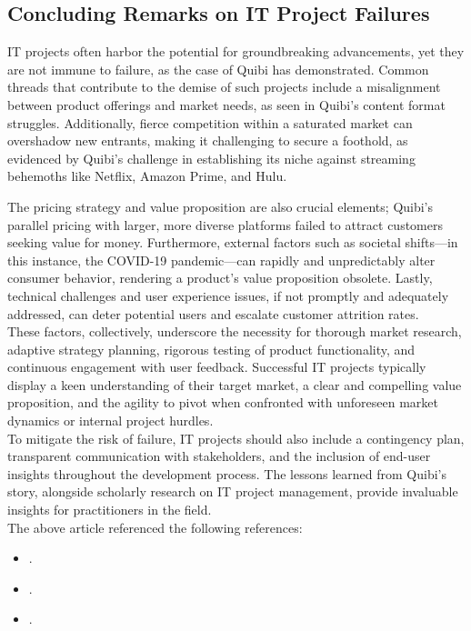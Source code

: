 \documentclass[12pt,a4paper]{article}
\begin{document}
\subsection{Concluding Remarks on IT Project Failures}
\label{sec:Question 3}
\nocite{question_3.3}

\noindent IT projects often harbor the potential for groundbreaking advancements, yet they are not immune to failure, as the case of Quibi has demonstrated. Common threads that contribute to the demise of such projects include a misalignment between product offerings and market needs, as seen in Quibi's content format struggles. Additionally, fierce competition within a saturated market can overshadow new entrants, making it challenging to secure a foothold, as evidenced by Quibi's challenge in establishing its niche against streaming behemoths like Netflix, Amazon Prime, and Hulu.

\noindent The pricing strategy and value proposition are also crucial elements; Quibi's parallel pricing with larger, more diverse platforms failed to attract customers seeking value for money. Furthermore, external factors such as societal shifts—in this instance, the COVID-19 pandemic—can rapidly and unpredictably alter consumer behavior, rendering a product's value proposition obsolete. Lastly, technical challenges and user experience issues, if not promptly and adequately addressed, can deter potential users and escalate customer attrition rates.\\

\noindent These factors, collectively, underscore the necessity for thorough market research, adaptive strategy planning, rigorous testing of product functionality, and continuous engagement with user feedback. Successful IT projects typically display a keen understanding of their target market, a clear and compelling value proposition, and the agility to pivot when confronted with unforeseen market dynamics or internal project hurdles.\\

\noindent To mitigate the risk of failure, IT projects should also include a contingency plan, transparent communication with stakeholders, and the inclusion of end-user insights throughout the development process. The lessons learned from Quibi's story, alongside scholarly research on IT project management, provide invaluable insights for practitioners in the field.\\

\noindent The above article referenced the following references:
\begin{itemize}
    \item \cite{Ref3.1}.
    \item \cite{Ref3.2}.  
    \item \cite{Ref3.3}.  
\end{itemize}
\end{document}
